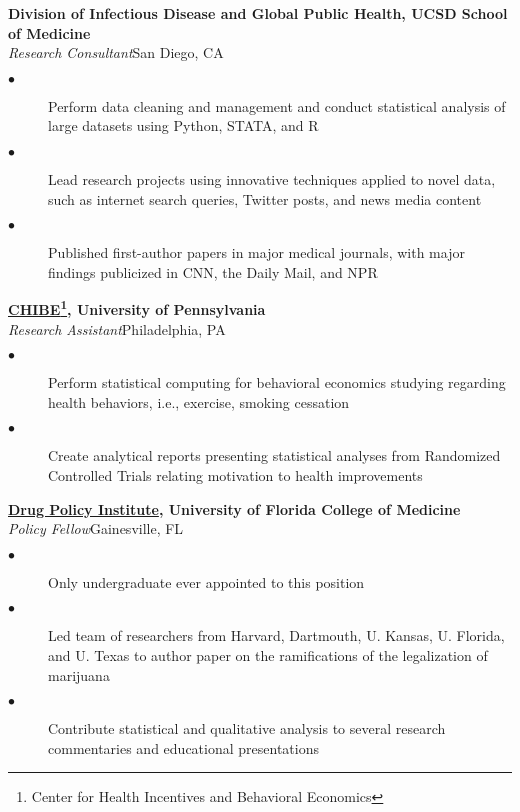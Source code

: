 \documentclass[10pt, letterpaper]{article}
\newcommand{\years}[1]{\marginnote{\normalsize #1}}
\begin{document}
\years{2017-}
\textbf{Division of Infectious Disease and Global Public Health, UCSD School of Medicine}\\
\emph{Research Consultant}\hfill San Diego, CA
\begin{description}
    \item[$\bullet$] Perform data cleaning and management and conduct statistical analysis of large datasets using Python, STATA, and R
    \item[$\bullet$] Lead research projects using innovative techniques applied to novel data, such as internet search queries, Twitter posts, and news media content
    \item[$\bullet$] Published first-author papers in major medical journals, with major findings publicized in CNN, the Daily Mail, and NPR
    \\[.2cm]
\end{description}


\years{2017-}
\textbf{\href{http://chibe.upenn.edu}{CHIBE\footnote{Center for Health Incentives and Behavioral Economics}}, University of Pennsylvania}\\%
\emph{Research Assistant}\hfill Philadelphia, PA
\begin{description}
    \item[$\bullet$] Perform statistical computing for behavioral economics studying regarding health behaviors, i.e., exercise, smoking cessation
    \item[$\bullet$] Create analytical reports presenting statistical analyses from Randomized Controlled Trials relating motivation to health improvements \\[.2cm]
\end{description}

\years{2015-}
\textbf{\href{http://drugpolicyinstitute.psychiatry.ufl.edu/}{Drug Policy Institute}, University of Florida College of Medicine}\\%
\emph{Policy Fellow}\hfill Gainesville, FL
\begin{description}
    \item[$\bullet$] Only undergraduate ever appointed to this position
    \item[$\bullet$] Led team of researchers from Harvard, Dartmouth, U. Kansas, U. Florida, and U. Texas to author paper on the ramifications of the legalization of marijuana
    \item[$\bullet$] Contribute statistical and qualitative analysis to several research commentaries and educational presentations
    \\[.2cm]
\end{description}
\end{document}

